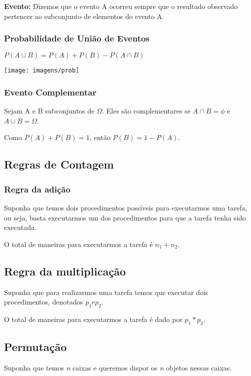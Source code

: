 \documentclass[a4paper, 12pt]{article}
\begin{document}
	\textbf{Evento:} Dizemos que o evento A ocorreu sempre que o resultado observado pertencer ao subconjunto de elementos do evento A.
	
\subsubsection{Probabilidade de União de Eventos}
	\begin{center}
		\LARGE
		$P(A\cup B) = P(A) + P(B) - P(A\cap B)$
	\end{center}
	\begin{center}
		\texttt{[image: imagens/prob]}
	\end{center}
	
\subsubsection{Evento Complementar}
	Sejam A e B subconjuntos de $\Omega$. Eles são complementares se $A\cap B= \phi$ e $A\cup B = \Omega$.
	
	Como $P(A) + P(B) = 1$, então $P(B) = 1 - P(A)$.

\subsection{Regras de Contagem}
\subsubsection{Regra da adição}
	Suponha que temos dois procedimentos possíveis para executarmos uma tarefa, ou seja, basta executarmos um dos procedimentos para que a tarefa tenha sido executada.
	
	O total de maneiras para executarmos a tarefa é $n_{1} + n_{2}$.
	
\subsection{Regra da multiplicação}
	Suponha que para realizarmos uma tarefa temos que executar dois procedimentos, denotados $p_{1} e p_{2}$.
	
	O total de maneiras para executarmos a tarefa é dado por $p_{1}*p_{2}$.
	
\subsection{Permutação}
	Suponha que temos \textit{n} caixas e queremos dispor os \textit{n} objetos nessas caixas. 
	
\end{document}
